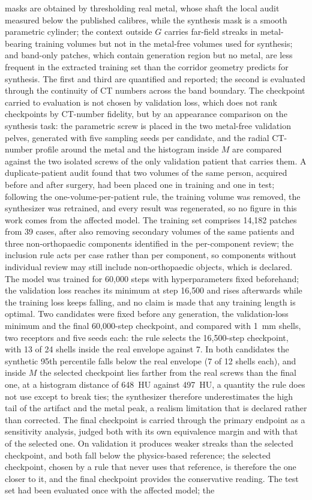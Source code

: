 \documentclass[9pt]{extarticle}
\begin{document}
\begin{enumerate}
masks are obtained by thresholding real metal, whose shaft the local audit measured below the published calibres, while the synthesis mask is a smooth parametric cylinder; the context outside $G$ carries far-field streaks in metal-bearing training volumes but not in the metal-free volumes used for synthesis; and band-only patches, which contain generation region but no metal, are less frequent in the extracted training set than the corridor geometry predicts for synthesis. The first and third are quantified and reported; the second is evaluated through the continuity of CT numbers across the band boundary. The checkpoint carried to evaluation is not chosen by validation loss, which does not rank checkpoints by CT-number fidelity, but by an appearance comparison on the synthesis task: the parametric screw is placed in the two metal-free validation pelves, generated with five sampling seeds per candidate, and the radial CT-number profile around the metal and the histogram inside $M$ are compared against the two isolated screws of the only validation patient that carries them. A duplicate-patient audit found that two volumes of the same person, acquired before and after surgery, had been placed one in training and one in test; following the one-volume-per-patient rule, the training volume was removed, the synthesizer was retrained, and every result was regenerated, so no figure in this work comes from the affected model. The training set comprises 14{,}182 patches from 39 cases, after also removing secondary volumes of the same patients and three non-orthopaedic components identified in the per-component review; the inclusion rule acts per case rather than per component, so components without individual review may still include non-orthopaedic objects, which is declared. The model was trained for 60{,}000 steps with hyperparameters fixed beforehand; the validation loss reaches its minimum at step 16{,}500 and rises afterwards while the training loss keeps falling, and no claim is made that any training length is optimal. Two candidates were fixed before any generation, the validation-loss minimum and the final 60{,}000-step checkpoint, and compared with 1~mm shells, two receptors and five seeds each: the rule selects the 16{,}500-step checkpoint, with 13 of 24 shells inside the real envelope against 7. In both candidates the synthetic 95th percentile falls below the real envelope (7 of 12 shells each), and inside $M$ the selected checkpoint lies farther from the real screws than the final one, at a histogram distance of 648~HU against 497~HU, a quantity the rule does not use except to break ties; the synthesizer therefore underestimates the high tail of the artifact and the metal peak, a realism limitation that is declared rather than corrected. The final checkpoint is carried through the primary endpoint as a sensitivity analysis, judged both with its own equivalence margin and with that of the selected one. On validation it produces weaker streaks than the selected checkpoint, and both fall below the physics-based reference; the selected checkpoint, chosen by a rule that never uses that reference, is therefore the one closer to it, and the final checkpoint provides the conservative reading. The test set had been evaluated once with the affected model; the 
\end{enumerate}
\end{document}
